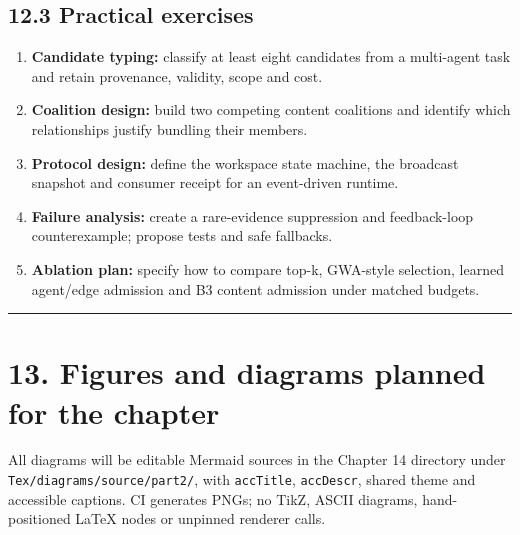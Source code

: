 \subsection{12.3 Practical exercises}\label{123-practical-exercises}

\begin{enumerate}
\def\labelenumi{\arabic{enumi}.}
\tightlist
\item
  \textbf{Candidate typing:} classify at least eight candidates from a multi-agent task and retain provenance, validity, scope and cost.
\item
  \textbf{Coalition design:} build two competing content coalitions and identify which relationships justify bundling their members.
\item
  \textbf{Protocol design:} define the workspace state machine, the broadcast snapshot and consumer receipt for an event-driven runtime.
\item
  \textbf{Failure analysis:} create a rare-evidence suppression and feedback-loop counterexample; propose tests and safe fallbacks.
\item
  \textbf{Ablation plan:} specify how to compare top-k, GWA-style selection, learned agent/edge admission and B3 content admission under matched budgets.
\end{enumerate}

\begin{center}\rule{0.5\linewidth}{0.5pt}\end{center}

\section{13. Figures and diagrams planned for the chapter}\label{13-figures-and-diagrams-planned-for-the-chapter}

All diagrams will be editable Mermaid sources in the Chapter 14 directory under \texttt{Tex/diagrams/source/part2/}, with \texttt{accTitle}, \texttt{accDescr}, shared theme and accessible captions. CI generates PNGs; no TikZ, ASCII diagrams, hand-positioned LaTeX nodes or unpinned renderer calls.

